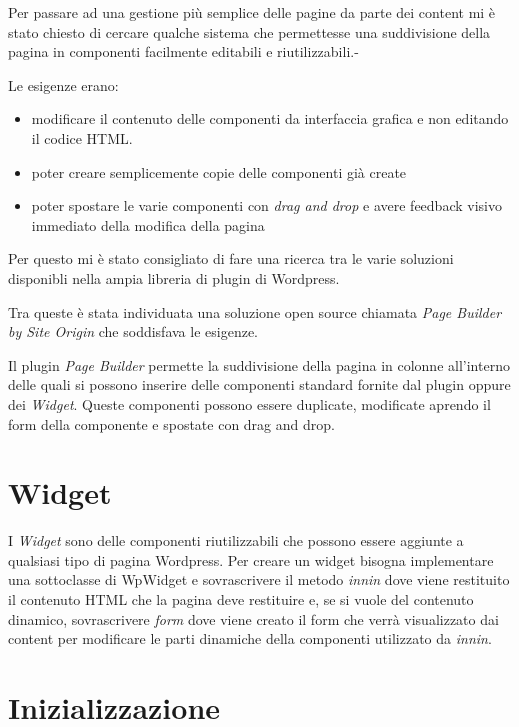 


Per passare ad una gestione più semplice delle pagine da parte dei content
mi è stato chiesto di cercare qualche sistema che permettesse una suddivisione
della pagina in componenti facilmente editabili e riutilizzabili.-

Le esigenze erano:
\begin{itemize}
\item modificare il contenuto delle componenti da interfaccia grafica e non 
editando il codice HTML.
\item poter creare semplicemente copie delle componenti già create
\item poter spostare le varie componenti con \emph{drag and drop} e avere
feedback visivo immediato della modifica della pagina
\end{itemize}

Per questo mi è stato consigliato di fare una ricerca tra le varie soluzioni disponibli
nella ampia libreria di plugin di Wordpress.

Tra queste è stata individuata una soluzione open source chiamata \emph{Page Builder by
Site Origin} che soddisfava le esigenze.

Il plugin \emph{Page Builder} permette la suddivisione della pagina in colonne all'interno delle quali
si possono inserire delle componenti standard fornite dal plugin oppure dei \emph{Widget}.
Queste componenti possono essere duplicate, modificate aprendo il form della componente e spostate
con drag and drop.
\section{Widget}
I \emph{Widget} sono delle componenti riutilizzabili che possono essere aggiunte a qualsiasi
tipo di pagina Wordpress. Per creare un widget bisogna implementare una sottoclasse di WpWidget
e sovrascrivere il metodo \emph{innin} dove viene restituito il contenuto HTML che la pagina deve restituire
e, se si vuole del contenuto dinamico, sovrascrivere \emph{form} dove viene creato il form che verrà visualizzato dai content per modificare le
parti dinamiche della componenti utilizzato da \emph{innin}.

\section{Inizializzazione}
